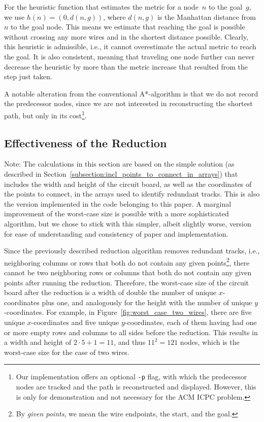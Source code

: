 \documentclass[sigconf,nonacm,screen]{acmart}
\begin{document}
For the heuristic function that estimates the metric for a node~$n$ to the goal~$g$, we use $h(n) = (0, d(n,g))$, where $d(n,g)$ is the Manhattan distance from $n$ to the goal node. This means we estimate that reaching the goal is possible without crossing any more wires and in the shortest distance possible. Clearly, this heuristic is admissible, i.e., it cannot overestimate the actual metric to reach the goal. It is also consistent, meaning that traveling one node further can never decrease the heuristic by more than the metric increase that resulted from the step just taken.

A notable alteration from the conventional A*-algorithm is that we do not record the predecessor nodes, since we are not interested in reconstructing the shortest path, but only in its cost\footnote{Our implementation offers an optional \texttt{-p} flag, with which the predecessor nodes are tracked and the path is reconstructed and displayed. However, this is only for demonstration and not necessary for the ACM ICPC problem.}.

\subsection{Effectiveness of the Reduction} \label{subsection:effectiveness_reduction}
Note: The calculations in this section are based on the simple solution (as described in Section~\ref{subsection:incl_points_to_connect_in_arrays}) that includes the width and height of the circuit board, as well as the coordinates of the points to connect, in the arrays used to identify redundant tracks. This is also the version implemented in the code belonging to this paper. A marginal improvement of the worst-case size is possible with a more sophisticated algorithm, but we chose to stick with this simpler, albeit slightly worse, version for ease of understanding and consistency of paper and implementation.

Since the previously described reduction algorithm removes redundant tracks, i.e., neighboring columns or rows that both do not contain any given points\footnote{By \emph{given points}, we mean the wire endpoints, the start, and the goal.}, there cannot be two neighboring rows or columns that both do not contain any given points after running the reduction. Therefore, the worst-case size of the circuit board after the reduction is a width of double the number of unique $x$-coordinates plus one, and analogously for the height with the number of unique $y$-coordinates. For example, in Figure~\ref{fig:worst_case_two_wires}, there are five unique $x$-coordinates and five unique $y$-coordinates, each of them having had one or more empty rows and columns to all sides before the reduction.
This results in a width and height of $2 \cdot 5 + 1 = 11$, and thus $11^2=121$ nodes, which is the worst-case size for the case of two wires.
\end{document}
